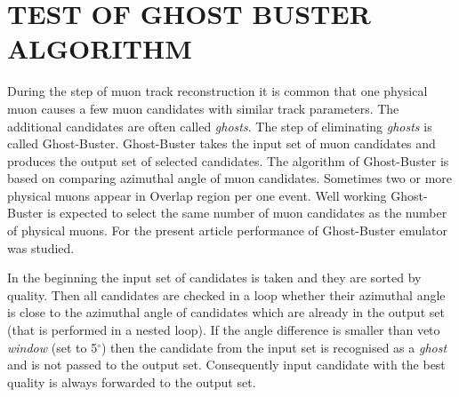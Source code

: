 \section{TEST OF GHOST BUSTER ALGORITHM}

During the step of muon track reconstruction it is common that one physical muon causes a few muon candidates with similar track parameters. The additional candidates are often called \textit{ghosts}. The step of eliminating \textit{ghosts} is called Ghost-Buster. Ghost-Buster takes the input set of muon candidates and produces the output set of selected candidates. The algorithm of Ghost-Buster is based on comparing azimuthal angle of muon candidates. Sometimes two or more physical muons appear in Overlap region per one event. Well working Ghost-Buster is expected to select the same number of muon candidates as the number of physical muons. For the present article performance of Ghost-Buster emulator was studied.

In the beginning the input set of candidates is taken and they are sorted by quality. Then all candidates are checked in a loop whether their azimuthal angle is close to the azimuthal angle of candidates which are already in the output set (that is performed in a nested loop). If the angle difference is smaller than veto \textit{window} (set to 5$^\circ$) then the candidate from the input set is recognised as a \textit{ghost} and is not passed to the output set. Consequently input candidate with the best quality is always forwarded to the output set.

